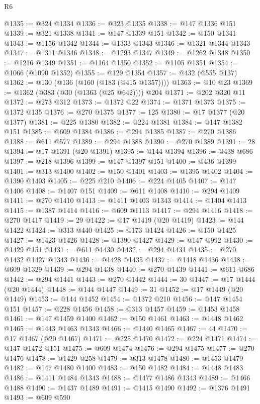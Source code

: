 \begin{lexlean}{R6}
\begin{coremodule}
@1335 := @324 @1334
@1336 := @323 @1335
@1338 := @147 @1336 @151
@1339 := @321 @1338
@1341 := @147 @1339 @151
@1342 := @150 @1341
@1343 := @1156 @1342
@1344 := @1333 @1343
@1346 := @1321 @1344 @1343
@1347 := @1311 @1346
@1348 := @1293 @1347
@1349 := @1262 @1348
@1350 := @1216 @1349
@1351 := @1164 @1350
@1352 := @1105 @1351
@1354 := @1066 (@1090 @1352)
@1355 := @129 @1354
@1357 := @432 (@555 @137)
@1362 := @130 (@136 (@160 (@183 (@415 @1357))))
@1363 := @10 @23
@1369 := @1362 (@383 (@30 (@1363 (@25 @642)))) @204
@1371 := @202 @320 @11
@1372 := @273 @312
@1373 := @1372 @22
@1374 := @1371 @1373
@1375 := @1372 @135
@1376 := @270 @1375
@1377 := 125
@1380 := @17 @1377 (@20 @1377)
@1381 := @225 @1380
@1382 := @224 @1381
@1384 := @147 @1382 @151
@1385 := @609 @1384
@1386 := @294 @1385
@1387 := @270 @1386
@1388 := @611 @577
@1389 := @294 @1388
@1390 := @270 @1389
@1391 := 28
@1394 := @17 @1391 (@20 @1391)
@1395 := @144 @1394
@1396 := @438 @686
@1397 := @218 @1396
@1399 := @147 @1397 @151
@1400 := @436 @1399
@1401 := @313 @1400
@1402 := @150 @1401
@1403 := @1395 @1402
@1404 := @1390 @1403
@1405 := @225 @210
@1406 := @224 @1405
@1407 := @147 @1406
@1408 := @1407 @151
@1409 := @611 @1408
@1410 := @294 @1409
@1411 := @270 @1410
@1413 := @1411 @1403 @1343
@1414 := @1404 @1413
@1415 := @1387 @1414
@1416 := @609 @1113
@1417 := @294 @1416
@1418 := @270 @1417
@1419 := 29
@1422 := @17 @1419 (@20 @1419)
@1423 := @144 @1422
@1424 := @313 @440
@1425 := @173 @1424
@1426 := @150 @1425
@1427 := @1423 @1426
@1428 := @1390 @1427
@1429 := @147 @992
@1430 := @1429 @151
@1431 := @611 @1430
@1432 := @294 @1431
@1435 := @270 @1432 @1427 @1343
@1436 := @1428 @1435
@1437 := @1418 @1436
@1438 := @609 @1329
@1439 := @294 @1438
@1440 := @270 @1439
@1441 := @611 @686
@1442 := @294 @1441
@1443 := @270 @1442
@1444 := 30
@1447 := @17 @1444 (@20 @1444)
@1448 := @144 @1447
@1449 := 31
@1452 := @17 @1449 (@20 @1449)
@1453 := @144 @1452
@1454 := @1372 @210
@1456 := @147 @1454 @151
@1457 := @228 @1456
@1458 := @313 @1457
@1459 := @1453 @1458
@1461 := @147 @1459 @1400
@1462 := @150 @1461
@1463 := @1448 @1462
@1465 := @1443 @1463 @1343
@1466 := @1440 @1465
@1467 := 44
@1470 := @17 @1467 (@20 @1467)
@1471 := @225 @1470
@1472 := @224 @1471
@1474 := @147 @1472 @151
@1475 := @609 @1474
@1476 := @294 @1475
@1477 := @270 @1476
@1478 := @1429 @258
@1479 := @313 @1478
@1480 := @1453 @1479
@1482 := @147 @1480 @1400
@1483 := @150 @1482
@1484 := @1448 @1483
@1486 := @1411 @1484 @1343
@1488 := @1477 @1486 @1343
@1489 := @1466 @1488
@1490 := @1437 @1489
@1491 := @1415 @1490
@1492 := @1376 @1491
@1493 := @609 @590

\end{coremodule}
\end{lexlean}
